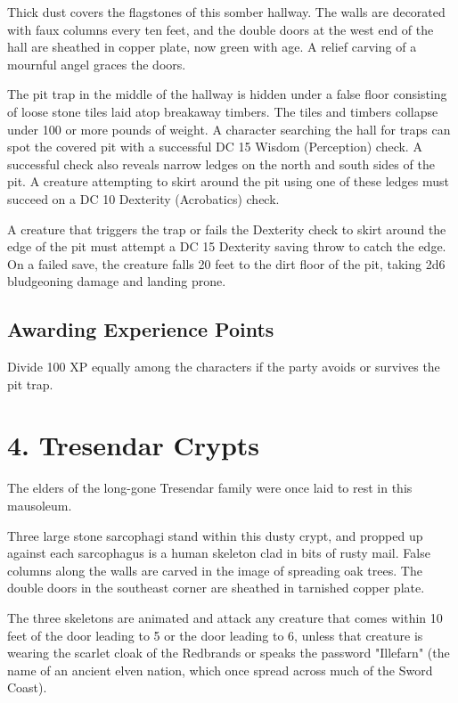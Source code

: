 \documentclass[10pt,a4paper,twoside,bg=print,twocolumn,openany,nodeprecatedcode]{dndbook}
\begin{document}
\begin{DndReadAloud}{}
Thick dust covers the flagstones of this somber hallway. The walls are decorated with faux columns every ten feet, and the double doors at the west end of the hall are sheathed in copper plate, now green with age. A relief carving of a mournful angel graces the doors.

\end{DndReadAloud}

The pit trap in the middle of the hallway is hidden under a false floor consisting of loose stone tiles laid atop breakaway timbers. The tiles and timbers collapse under 100 or more pounds of weight. A character searching the hall for traps can spot the covered pit with a successful DC 15 Wisdom (Perception) check. A successful check also reveals narrow ledges on the north and south sides of the pit. A creature attempting to skirt around the pit using one of these ledges must succeed on a DC 10 Dexterity (Acrobatics) check.

A creature that triggers the trap or fails the Dexterity check to skirt around the edge of the pit must attempt a DC 15 Dexterity saving throw to catch the edge. On a failed save, the creature falls 20 feet to the dirt floor of the pit, taking 2d6 bludgeoning damage and landing prone.

\subsection{Awarding Experience Points}
Divide 100 XP equally among the characters if the party avoids or survives the pit trap.

\section{4. Tresendar Crypts}
The elders of the long-gone Tresendar family were once laid to rest in this mausoleum.

\begin{DndReadAloud}{}
Three large stone sarcophagi stand within this dusty crypt, and propped up against each sarcophagus is a human skeleton clad in bits of rusty mail. False columns along the walls are carved in the image of spreading oak trees. The double doors in the southeast corner are sheathed in tarnished copper plate.

\end{DndReadAloud}

The three skeletons are animated and attack any creature that comes within 10 feet of the door leading to 5 or the door leading to 6, unless that creature is wearing the scarlet cloak of the Redbrands or speaks the password "Illefarn" (the name of an ancient elven nation, which once spread across much of the Sword Coast).
\end{document}
